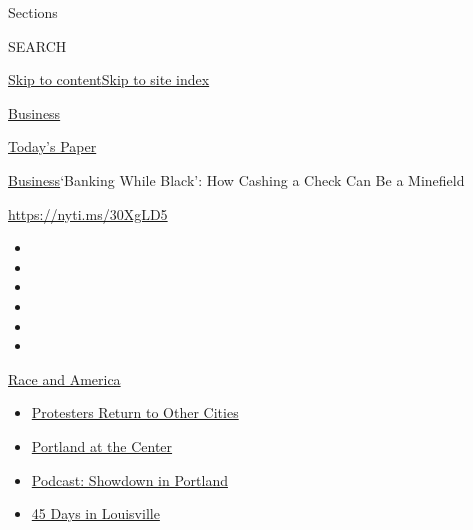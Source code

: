 Sections

SEARCH

\protect\hyperlink{site-content}{Skip to
content}\protect\hyperlink{site-index}{Skip to site index}

\href{https://www.nytimes3xbfgragh.onion/section/business}{Business}

\href{https://myaccount.nytimes3xbfgragh.onion/auth/login?response_type=cookie\&client_id=vi}{}

\href{https://www.nytimes3xbfgragh.onion/section/todayspaper}{Today's
Paper}

\href{/section/business}{Business}\textbar{}`Banking While Black': How
Cashing a Check Can Be a Minefield

\url{https://nyti.ms/30XgLD5}

\begin{itemize}
\item
\item
\item
\item
\item
\item
\end{itemize}

\href{https://www.nytimes3xbfgragh.onion/news-event/george-floyd-protests-minneapolis-new-york-los-angeles?action=click\&pgtype=Article\&state=default\&region=TOP_BANNER\&context=storylines_menu}{Race
and America}

\begin{itemize}
\tightlist
\item
  \href{https://www.nytimes3xbfgragh.onion/2020/07/26/us/protests-portland-seattle-trump.html?action=click\&pgtype=Article\&state=default\&region=TOP_BANNER\&context=storylines_menu}{Protesters
  Return to Other Cities}
\item
  \href{https://www.nytimes3xbfgragh.onion/2020/07/24/us/portland-oregon-protests-white-race.html?action=click\&pgtype=Article\&state=default\&region=TOP_BANNER\&context=storylines_menu}{Portland
  at the Center}
\item
  \href{https://www.nytimes3xbfgragh.onion/2020/07/23/podcasts/the-daily/portland-protests.html?action=click\&pgtype=Article\&state=default\&region=TOP_BANNER\&context=storylines_menu}{Podcast:
  Showdown in Portland}
\item
  \href{https://www.nytimes3xbfgragh.onion/interactive/2020/07/16/us/black-lives-matter-protests-louisville-breonna-taylor.html?action=click\&pgtype=Article\&state=default\&region=TOP_BANNER\&context=storylines_menu}{45
  Days in Louisville}
\end{itemize}

